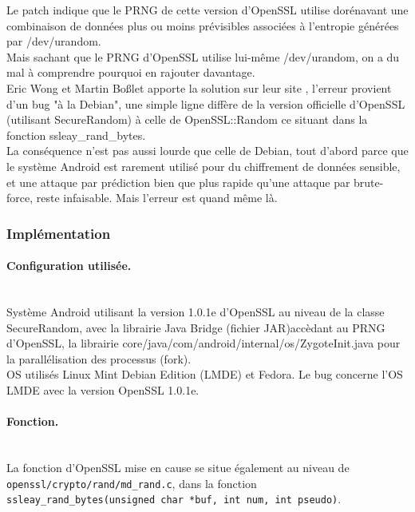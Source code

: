 			Le patch indique que le PRNG de cette version d'OpenSSL utilise dorénavant 
			une combinaison de données plus ou moins prévisibles associées à 
			l'entropie générées par /dev/urandom. \\
			Mais sachant que le PRNG d'OpenSSL utilise lui-même /dev/urandom, on a du 
			mal à comprendre pourquoi en rajouter davantage.\\
		
			Eric Wong et Martin Boßlet apporte la solution sur leur site
			\cite{boblet2013android}, l'erreur 
			provient d'un bug "à la Debian", une simple ligne diffère de la version 
			officielle d'OpenSSL (utilisant SecureRandom) à celle de OpenSSL::Random 
			ce situant dans la fonction ssleay\_rand\_bytes. \\
		
			La conséquence n'est pas aussi lourde que celle de Debian, tout d'abord 
			parce que le système Android est rarement utilisé pour du 
			chiffrement de données sensible, et une attaque par prédiction bien que
			plus rapide qu'une attaque par brute-force, reste infaisable. 
			Mais l'erreur est quand même là. \\
	
		
		\subsubsection{Implémentation}
			
			\paragraph{Configuration utilisée.}\\

			Système Android utilisant la version 1.0.1e d'OpenSSL au 
			niveau de la classe SecureRandom, avec la librairie Java Bridge 
			(fichier JAR)accèdant au PRNG d'OpenSSL, la librairie 
			core/java/com/android/internal/os/ZygoteInit.java pour 
			la parallélisation des processus (fork).\\
			
			OS utilisés Linux Mint Debian Edition (LMDE) et Fedora.
			Le bug concerne l'OS LMDE avec la version OpenSSL 1.0.1e.
			
			\paragraph{Fonction.}\\
			
			La fonction d'OpenSSL mise en cause se situe également
			au niveau de \texttt{openssl/crypto/rand/md\_rand.c}, dans
			la fonction \texttt{ssleay\_rand\_bytes(unsigned char *buf, 
			int num, int pseudo)}.
		
